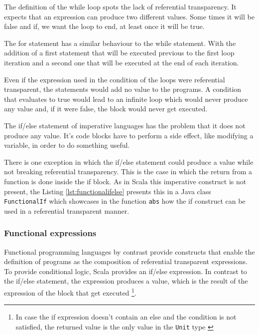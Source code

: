 \documentclass[../main.tex]{subfiles}
\begin{document}
The definition of the while loop spots the lack of referential transparency. It
expects that an expression can produce two different values. Some times it will
be false and if, we want the loop to end, at least once it will be true.

The for statement has a similar behaviour to the while statement. With the addition of a first
statement that will be executed previous to the first loop iteration and a second one that
will be executed at the end of each iteration.

Even if the expression used in the condition of the loops were referential
transparent, the statements would add no value to the programs. A condition that
evaluates to true would lead to an infinite loop which would never produce any
value and, if it were false, the block would never get executed.

The if/else statement of imperative languages has the problem that it does not
produce any value. It's code blocks have to perform a side effect, like modifying
a variable, in order to do something useful.

There is one exception in which the if/else statement could produce a value
while not breaking referential transparency. This is the case in which the
return from a function is done inside the if block. As in Scala this imperative
construct is not present, the Listing \ref{lst:functionalifelse} presents this in
a Java class \texttt{FunctionalIf} which showcases in the function
\texttt{abs} how the if construct can be used in a referential transparent manner.




\subsubsection{Functional expressions} Functional programming languages by
contrast provide constructs that enable the definition of programs as the
composition of referential transparent expressions. To provide conditional logic, Scala provides an if/else
expression. In contrast to the if/else statement, the expression produces a
value, which is the result of the expression of the block that get executed
\footnote{In case the if expression doesn't contain an else and the
condition is not satisfied, the returned value is the only value in the \texttt{Unit} type
\autocite{ScalaScala.Unit}}.
\end{document}
